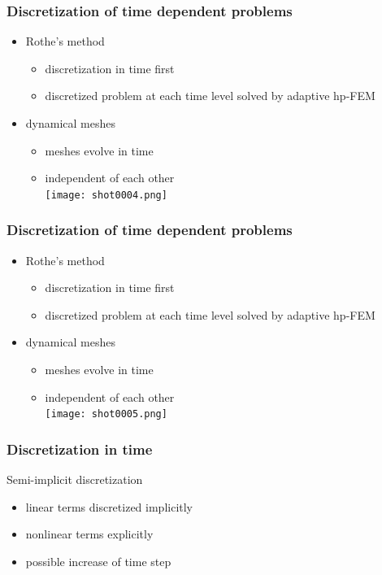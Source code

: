 \documentclass{beamer}
\begin{document}
\begin{frame}
\frametitle{Discretization of time dependent problems}
\begin{itemize}
\item Rothe's method\ \\
\begin{itemize}
\item discretization in time first
\item discretized problem at each time level solved by adaptive hp-FEM
\end{itemize}
\item dynamical meshes
\begin{itemize}
\item meshes evolve in time
\item independent of each other
\\
\texttt{[image: shot0004.png]}
\end{itemize}
\end{itemize}
\end{frame}
\begin{frame}
\frametitle{Discretization of time dependent problems}
\begin{itemize}
\item Rothe's	 method\ \\
\begin{itemize}
\item discretization in time first
\item discretized problem at each time level solved by adaptive hp-FEM
\end{itemize}
\item dynamical meshes
\begin{itemize}
\item meshes evolve in time
\item independent of each other
\\
\texttt{[image: shot0005.png]}
\end{itemize}
\end{itemize}
\end{frame}

\begin{frame}
\frametitle{Discretization in time}
Semi-implicit discretization\ \\
\begin{itemize}
\item linear terms discretized implicitly
\item nonlinear terms explicitly
\item possible increase of time step %
\end{itemize}
\end{frame}
\end{document}
